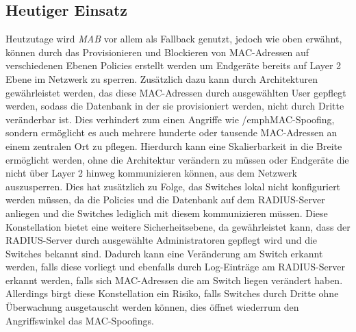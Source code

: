 \documentclass[conference]{IEEEtran}
\begin{document}
\subsection{Heutiger Einsatz}
Heutzutage wird \emph{MAB} vor allem als Fallback genutzt, jedoch wie oben erwähnt, können durch das Provisionieren und Blockieren von MAC-Adressen auf verschiedenen Ebenen Policies erstellt werden um Endgeräte bereits auf Layer 2 Ebene im Netzwerk zu sperren. Zusätzlich dazu kann durch Architekturen gewährleistet werden, das diese MAC-Adressen durch ausgewählten User gepflegt werden, sodass die Datenbank in der sie provisioniert werden, nicht durch Dritte veränderbar ist. Dies verhindert zum einen Angriffe wie /emph{MAC-Spoofing}, sondern ermöglicht es auch mehrere hunderte oder tausende MAC-Adressen an einem zentralen Ort zu pflegen. Hierdurch kann eine Skalierbarkeit in die Breite ermöglicht werden, ohne die Architektur verändern zu müssen oder Endgeräte die nicht über Layer 2 hinweg kommunizieren können, aus dem Netzwerk auszusperren. Dies hat zusätzlich zu Folge, das Switches lokal nicht konfiguriert werden müssen, da die Policies und die Datenbank auf dem RADIUS-Server anliegen und die Switches lediglich mit diesem kommunizieren müssen.
Diese Konstellation bietet eine weitere Sicherheitsebene, da gewährleistet kann, dass der RADIUS-Server durch ausgewählte Administratoren gepflegt wird und die Switches bekannt sind. Dadurch kann eine Veränderung am Switch erkannt werden, falls diese vorliegt und ebenfalls durch Log-Einträge am RADIUS-Server erkannt werden, falls sich MAC-Adressen die am Switch liegen verändert haben. Allerdings birgt diese Konstellation ein Risiko, falls Switches durch Dritte ohne Überwachung ausgetauscht werden können, dies öffnet wiederrum den Angriffswinkel das MAC-Spoofings.
\end{document}

